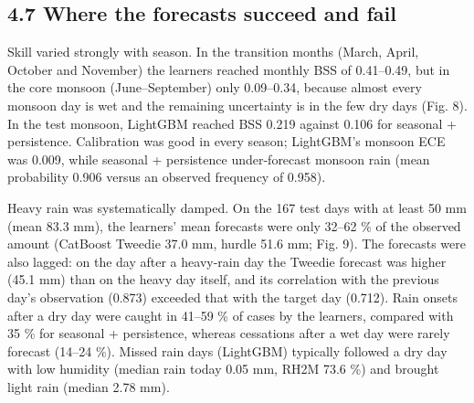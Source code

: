 \documentclass[
]{article}
\begin{document}
\hypertarget{where-the-forecasts-succeed-and-fail}{%
\subsection{4.7 Where the forecasts succeed and fail}\label{where-the-forecasts-succeed-and-fail}}

Skill varied strongly with season. In the transition months (March, April, October and November) the learners reached monthly BSS of 0.41--0.49, but in the core monsoon (June--September) only 0.09--0.34, because almost every monsoon day is wet and the remaining uncertainty is in the few dry days (Fig. 8).  %
In the test monsoon, LightGBM reached BSS 0.219 against 0.106 for seasonal + persistence.  %
Calibration was good in every season; LightGBM's monsoon ECE was 0.009, while seasonal + persistence under-forecast monsoon rain (mean probability 0.906 versus an observed frequency of 0.958).  %

Heavy rain was systematically damped. On the 167 test days with at least 50 mm (mean 83.3 mm), the learners' mean forecasts were only 32--62 \% of the observed amount (CatBoost Tweedie 37.0 mm, hurdle 51.6 mm; Fig. 9).  %
The forecasts were also lagged: on the day after a heavy-rain day the Tweedie forecast was higher (45.1 mm) than on the heavy day itself, and its correlation with the previous day's observation (0.873) exceeded that with the target day (0.712).  %
Rain onsets after a dry day were caught in 41--59 \% of cases by the learners, compared with 35 \% for seasonal + persistence, whereas cessations after a wet day were rarely forecast (14--24 \%).  %
Missed rain days (LightGBM) typically followed a dry day with low humidity (median rain today 0.05 mm, RH2M 73.6 \%) and brought light rain (median 2.78 mm).  %
\end{document}

